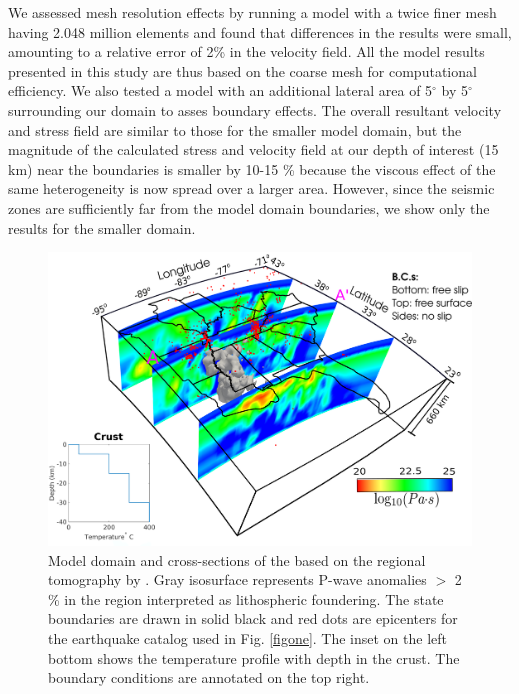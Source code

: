 \documentclass[draft,linenumbers]{agujournal2018}
\begin{document}
We assessed mesh resolution effects by running a model with a twice finer mesh having 2.048 million elements and found that differences in the results were small, amounting to a relative error of 2\% in the velocity field. All the model results presented in this study are thus based on the coarse mesh for computational efficiency. We also tested a model with an additional lateral area of 5$^{\circ}$ by 5$^{\circ}$ surrounding our domain to asses boundary effects. The overall resultant velocity and stress field are similar to those for the smaller model domain, but the magnitude of the calculated stress and velocity field at our depth of interest (15 km) near the boundaries is smaller by 10-15 \% because the viscous effect of the same heterogeneity is now spread over a larger area. However, since the seismic zones are sufficiently far from the model domain boundaries, we show only the results for the smaller domain.
%
\begin{figure}[ht]
    \centering
    \includegraphics[width=0.75\linewidth]{figures/model_figure.png}
    \caption{Model domain and cross-sections of the  based on the regional tomography by \citet{Biryol_2016}. Gray isosurface represents P-wave anomalies $>$ 2 \% in the region interpreted as lithospheric foundering. 
The state boundaries are drawn in solid black and red dots are epicenters for the earthquake catalog used in Fig. \ref{figone}. The inset on the left bottom shows the  temperature profile with depth in the crust. The boundary conditions are annotated on the top right.}
    \label{fig_model}
\end{figure}
\end{document}
